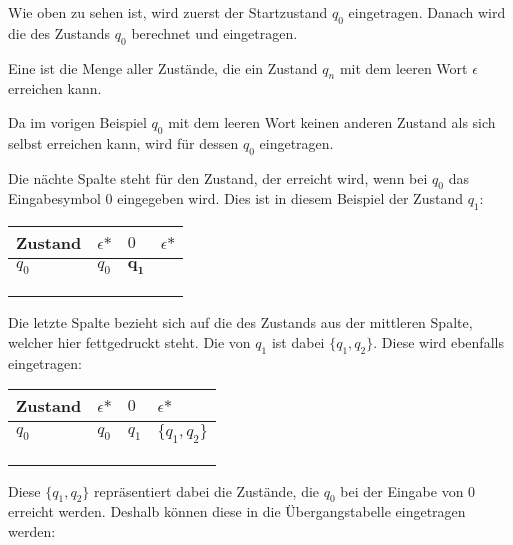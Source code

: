 Wie oben zu sehen ist, wird zuerst der Startzustand $q_0$ eingetragen. Danach wird die \ehu des Zustands $q_0$ berechnet und eingetragen.
\begin{definition}
    Eine \ehu ist die Menge aller Zustände, die ein Zustand $q_n$ mit dem leeren Wort $\epsilon$ erreichen kann.
\end{definition}
Da im vorigen Beispiel $q_0$ mit dem leeren Wort keinen anderen Zustand als sich selbst erreichen kann, wird für dessen \ehu $q_0$ eingetragen.\par
Die nächte Spalte steht für den Zustand, der erreicht wird, wenn bei $q_0$ das Eingabesymbol $0$ eingegeben wird. Dies ist in diesem Beispiel der Zustand $q_1$:
\begin{table}[H]
    \centering
    \begin{tabular}{|l|l|l|l|}
    \hline
    Zustand & $\epsilon\mbox{*}$ & $0$   & $\epsilon\mbox{*}$ \\ \hline
    $q_0$   & $q_0$              & $\mathbf{q_1}$ &                    \\ \hline
            &                    &       &                    \\ \hline
            &                    &       &                    \\ \hline
            &                    &       &                    \\ \hline
    \end{tabular}
\end{table}
Die letzte Spalte bezieht sich auf die \ehu des Zustands aus der mittleren Spalte, welcher hier fettgedruckt steht. Die \ehu von $q_1$ ist dabei $\{q_1, q_2\}$. Diese wird ebenfalls eingetragen:
\begin{table}[H]
    \centering
    \begin{tabular}{|l|l|l|l|}
    \hline
    Zustand & $\epsilon\mbox{*}$ & $0$   & $\epsilon\mbox{*}$ \\ \hline
    $q_0$   & $q_0$              & $q_1$ & $\{q_1,q_2\}$      \\ \hline
            &                    &       &                    \\ \hline
            &                    &       &                    \\ \hline
            &                    &       &                    \\ \hline
    \end{tabular}
\end{table}
Diese \ehu $\{q_1, q_2\}$ repräsentiert dabei die Zustände, die $q_0$ bei der Eingabe von $0$ erreicht werden. Deshalb können diese in die Übergangstabelle eingetragen werden:
